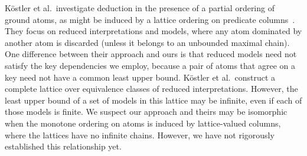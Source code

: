 
K\"{o}stler et al.\ investigate deduction in the presence of a partial ordering
of ground atoms, as might be induced by a lattice ordering on predicate
columns~\cite{Kostler1995}. They focus on reduced interpretations and models,
where any atom dominated by another atom is discarded (unless it belongs to an
unbounded maximal chain). One difference between their approach and ours is that
reduced models need not satisfy the key dependencies we employ, because a pair
of atoms that agree on a key need not have a common least upper bound.
K\"{o}stler et al.\ construct a complete lattice over equivalence classes of
reduced interpretations. However, the least upper bound of a set of models in
this lattice may be infinite, even if each of those models is finite. We suspect
our approach and theirs may be isomorphic when the monotone ordering on atoms is
induced by lattice-valued columns, where the lattices have no infinite
chains. However, we have not rigorously established this relationship yet.



